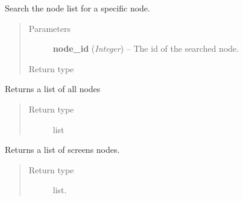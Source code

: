 \documentclass[letterpaper,10pt,english]{sphinxmanual}
\begin{document}
\begin{fulllineitems}
\begin{fulllineitems}
\end{fulllineitems}


\begin{fulllineitems}
\label{swnp:swnp.SWNP.find_node}
Search the node list for a specific node.
\begin{quote}\begin{description}
\item[{Parameters}] \leavevmode
\textbf{node\_id} (\emph{Integer}) -- The id of the searched node.

\item[{Return type}] \leavevmode
{\hyperref[swnp:swnp.Node]{}}

\end{description}\end{quote}

\end{fulllineitems}


\begin{fulllineitems}
\label{swnp:swnp.SWNP.get_list}
Returns a list of all nodes
\begin{quote}\begin{description}
\item[{Return type}] \leavevmode
list

\end{description}\end{quote}

\end{fulllineitems}


\begin{fulllineitems}
\label{swnp:swnp.SWNP.get_screen_list}
Returns a list of screens nodes.
\begin{quote}\begin{description}
\item[{Return type}] \leavevmode
list.

\end{description}\end{quote}

\end{fulllineitems}


\end{fulllineitems}
\end{document}
